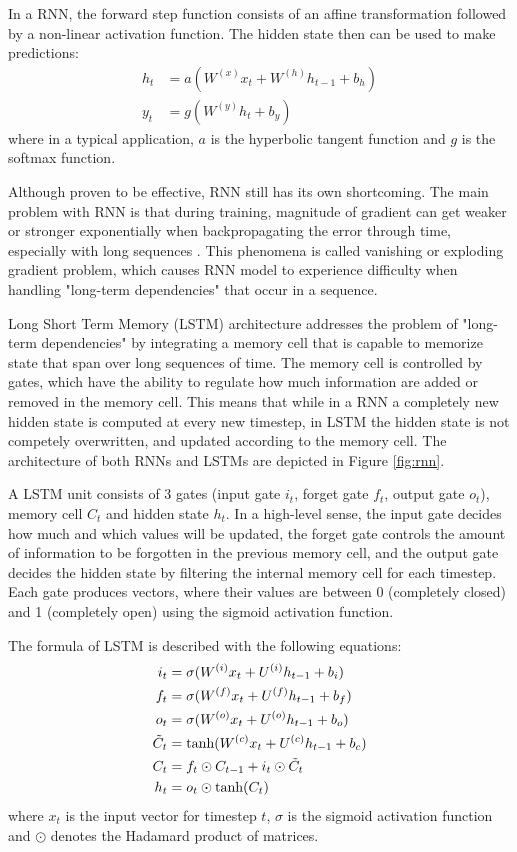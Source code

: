 \documentclass[12pt]{extarticle}
\begin{document}
In a RNN, the forward step function consists of an affine transformation followed by a non-linear activation function. The hidden state then can be used to make predictions:
\begin{align}
h_{t} &= a(W^{(x)}x_{t} + W^{(h)}h_{t-1} + b_{h})\\
y_{t} &= g(W^{(y)}h_{t} + b_{y}) 
\end{align}
where in a typical application, $a$ is the hyperbolic tangent function and $g$ is the softmax function.

Although proven to be effective, RNN still has its own shortcoming. The main problem with RNN is that during training, magnitude of gradient can get weaker or stronger exponentially when backpropagating the error through time, especially with long sequences \citep{Hochreiter:1998:VGP:353515.355233, 279181}. This phenomena is called vanishing or exploding gradient problem, which causes RNN model to experience difficulty when handling "long-term dependencies" that occur in a sequence.

Long Short Term Memory (LSTM) architecture \citep{Hochreiter:1997:LSM:1246443.1246450} addresses the problem of "long-term dependencies" by integrating a memory cell that is capable to memorize state that span over long sequences of time. The memory cell is controlled by gates, which have the ability to regulate how much information are added or removed in the memory cell. This means that while in a RNN a completely new hidden state is computed at every new timestep, in LSTM the hidden state is not competely overwritten, and updated according to the memory cell. The architecture of both RNNs and LSTMs are depicted in Figure \ref{fig:rnn}.

A LSTM unit consists of 3 gates (input gate $i_{t}$, forget gate $f_{t}$, output gate $o_{t}$), memory cell $C_{t}$ and hidden state $h_{t}$. In a high-level sense, the input gate decides how much and which values will be updated, the forget gate controls the amount of information to be forgotten in the previous memory cell, and the output gate decides the hidden state by filtering the internal memory cell for each timestep. Each gate produces vectors, where their values are between 0 (completely closed) and 1 (completely open) using the sigmoid activation function. 

The formula of LSTM is described with the following equations:
\begin{align}
i_{t} &= \sigma(W^{(i)}x_{t} + U^{(i)}h_{t-1} + b_{i}) \\
f_{t} &= \sigma(W^{(f)}x_{t} + U^{(f)}h_{t-1} + b_{f}) \\
o_{t} &= \sigma(W^{(o)}x_{t} + U^{(o)}h_{t-1} + b_{o}) \\
\tilde{C}_{t} &= \textnormal{tanh}(W^{(c)}x_{t} + U^{(c)}h_{t-1} + b_{c}) \\
C_{t} &= f_{t} \odot C_{t-1} + i_{t} \odot \tilde{C}_{t} \\
h_{t} &= o_{t} \odot \textnormal{tanh}(C_{t})
\end{align}
where $x_{t}$ is the input vector for timestep $t$, $\sigma$ is the sigmoid activation function and $\odot$ denotes the Hadamard product of matrices. 
\end{document}
